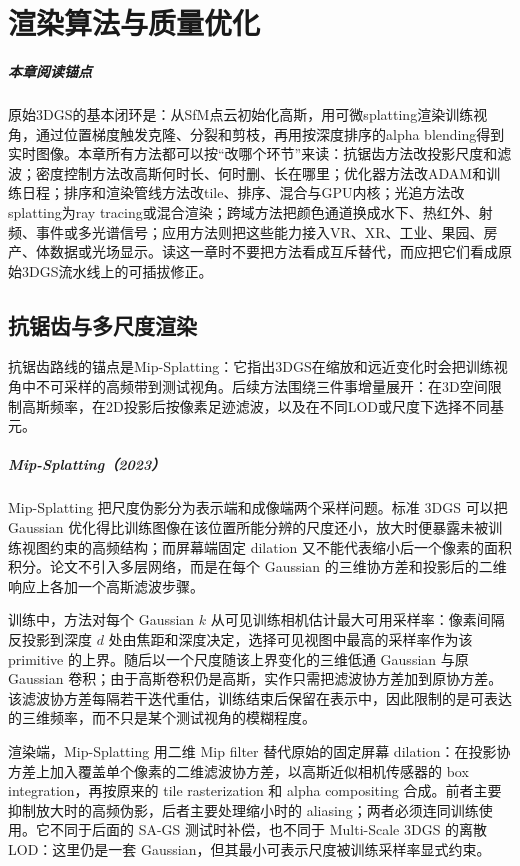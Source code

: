 \chapter{渲染算法与质量优化}

\paragraph*{本章阅读锚点}
原始3DGS的基本闭环是：从SfM点云初始化高斯，用可微splatting渲染训练视角，通过位置梯度触发克隆、分裂和剪枝，再用按深度排序的alpha blending得到实时图像。本章所有方法都可以按“改哪个环节”来读：抗锯齿方法改投影尺度和滤波；密度控制方法改高斯何时长、何时删、长在哪里；优化器方法改ADAM和训练日程；排序和渲染管线方法改tile、排序、混合与GPU内核；光追方法改splatting为ray tracing或混合渲染；跨域方法把颜色通道换成水下、热红外、射频、事件或多光谱信号；应用方法则把这些能力接入VR、XR、工业、果园、房产、体数据或光场显示。读这一章时不要把方法看成互斥替代，而应把它们看成原始3DGS流水线上的可插拔修正。

\section{抗锯齿与多尺度渲染}

抗锯齿路线的锚点是Mip-Splatting：它指出3DGS在缩放和远近变化时会把训练视角中不可采样的高频带到测试视角。后续方法围绕三件事增量展开：在3D空间限制高斯频率，在2D投影后按像素足迹滤波，以及在不同LOD或尺度下选择不同基元。

\paragraph{Mip-Splatting（2023）\cite{2311_16493}}
Mip-Splatting 把尺度伪影分为表示端和成像端两个采样问题。标准 3DGS 可以把 Gaussian 优化得比训练图像在该位置所能分辨的尺度还小，放大时便暴露未被训练视图约束的高频结构；而屏幕端固定 dilation 又不能代表缩小后一个像素的面积积分。论文不引入多层网络，而是在每个 Gaussian 的三维协方差和投影后的二维响应上各加一个高斯滤波步骤。

训练中，方法对每个 Gaussian $k$ 从可见训练相机估计最大可用采样率：像素间隔反投影到深度 $d$ 处由焦距和深度决定，选择可见视图中最高的采样率作为该 primitive 的上界。随后以一个尺度随该上界变化的三维低通 Gaussian 与原 Gaussian 卷积；由于高斯卷积仍是高斯，实作只需把滤波协方差加到原协方差。该滤波协方差每隔若干迭代重估，训练结束后保留在表示中，因此限制的是可表达的三维频率，而不只是某个测试视角的模糊程度。

渲染端，Mip-Splatting 用二维 Mip filter 替代原始的固定屏幕 dilation：在投影协方差上加入覆盖单个像素的二维滤波协方差，以高斯近似相机传感器的 box integration，再按原来的 tile rasterization 和 alpha compositing 合成。前者主要抑制放大时的高频伪影，后者主要处理缩小时的 aliasing；两者必须连同训练使用。它不同于后面的 SA-GS 测试时补偿，也不同于 Multi-Scale 3DGS 的离散 LOD：这里仍是一套 Gaussian，但其最小可表示尺度被训练采样率显式约束。

